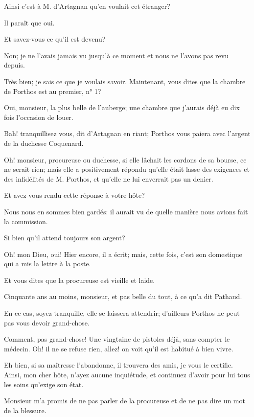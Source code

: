 \speak  Ainsi c'est à M. d'Artagnan qu'en voulait cet étranger? 

\speak  Il paraît que oui. 

\speak  Et savez-vous ce qu'il est devenu? 

\speak  Non; je ne l'avais jamais vu jusqu'à ce moment et nous ne l'avons pas revu depuis. 

\speak  Très bien; je sais ce que je voulais savoir. Maintenant, vous dites que la chambre de Porthos est au premier, n° 1? 

\speak  Oui, monsieur, la plus belle de l'auberge; une chambre que j'aurais déjà eu dix fois l'occasion de louer. 

\speak  Bah! tranquillisez vous, dit d'Artagnan en riant; Porthos vous paiera avec l'argent de la duchesse Coquenard. 

\speak  Oh! monsieur, procureuse ou duchesse, si elle lâchait les cordons de sa bourse, ce ne serait rien; mais elle a positivement répondu qu'elle était lasse des exigences et des infidélités de M. Porthos, et qu'elle ne lui enverrait pas un denier. 

\speak  Et avez-vous rendu cette réponse à votre hôte? 

\speak  Nous nous en sommes bien gardés: il aurait vu de quelle manière nous avions fait la commission. 

\speak  Si bien qu'il attend toujours son argent? 

\speak  Oh! mon Dieu, oui! Hier encore, il a écrit; mais, cette fois, c'est son domestique qui a mis la lettre à la poste. 

\speak  Et vous dites que la procureuse est vieille et laide. 

\speak  Cinquante ans au moins, monsieur, et pas belle du tout, à ce qu'a dit Pathaud. 

\speak  En ce cas, soyez tranquille, elle se laissera attendrir; d'ailleurs Porthos ne peut pas vous devoir grand-chose. 

\speak  Comment, pas grand-chose! Une vingtaine de pistoles déjà, sans compter le médecin. Oh! il ne se refuse rien, allez! on voit qu'il est habitué à bien vivre. 

\speak  Eh bien, si sa maîtresse l'abandonne, il trouvera des amis, je vous le certifie. Ainsi, mon cher hôte, n'ayez aucune inquiétude, et continuez d'avoir pour lui tous les soins qu'exige son état. 

\speak  Monsieur m'a promis de ne pas parler de la procureuse et de ne pas dire un mot de la blessure. 

